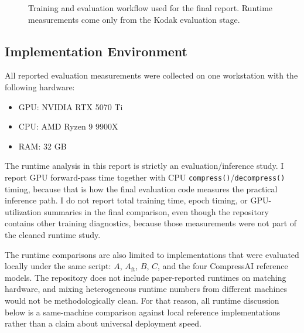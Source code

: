 \documentclass[10pt]{article}
\begin{document}
\begin{figure}[t]
\centering
{}
\caption{Training and evaluation workflow used for the final report. Runtime measurements come only from the Kodak evaluation stage.}
\label{fig:eval-pipeline}
\end{figure}

\subsection{Implementation Environment}
All reported evaluation measurements were collected on one workstation with the following hardware:
\begin{itemize}[leftmargin=1.3em]
  \item GPU: NVIDIA RTX 5070 Ti
  \item CPU: AMD Ryzen 9 9900X
  \item RAM: 32 GB
\end{itemize}

The runtime analysis in this report is strictly an evaluation/inference study. I report GPU forward-pass time together with CPU \texttt{compress()}/\texttt{decompress()} timing, because that is how the final evaluation code measures the practical inference path. I do not report total training time, epoch timing, or GPU-utilization summaries in the final comparison, even though the repository contains other training diagnostics, because those measurements were not part of the cleaned runtime study.

The runtime comparisons are also limited to implementations that were evaluated locally under the same script: \(A\), \(A_{\mathrm{ft}}\), \(B\), \(C\), and the four CompressAI reference models. The repository does not include paper-reported runtimes on matching hardware, and mixing heterogeneous runtime numbers from different machines would not be methodologically clean. For that reason, all runtime discussion below is a same-machine comparison against local reference implementations rather than a claim about universal deployment speed.
\end{document}
